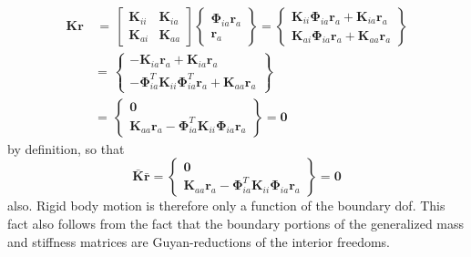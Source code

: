 \documentclass[10pt,openany,twoside]{book}
\numberwithin{equation}{section}   %
\newcommand{\Matrix}[1]{\boldsymbol{#1}}
\newcommand{\Vector}[1]{\boldsymbol{#1}}
\begin{document}
\begin{equation}
\begin{split}
\Matrix{K}\Vector{r} & \, = \, \left[
\begin{array}{cc}
   \Matrix{K}_{ii} & \Matrix{K}_{ia} \\
   \Matrix{K}_{ai} & \Matrix{K}_{aa}
\end{array}
\right] \left\{
\begin{array}{c}
   \Matrix{\Phi}_{ia} \Matrix{r}_a \\
   \Matrix{r}_a
\end{array}
\right\} =  \left\{
\begin{array}{c}
   \Matrix{K}_{ii} \Matrix{\Phi}_{ia} \Matrix{r}_a + \Matrix{K}_{ia} \Matrix{r}_a \\
   \Matrix{K}_{ai} \Matrix{\Phi}_{ia} \Matrix{r}_a + \Matrix{K}_{aa} \Matrix{r}_a
\end{array}
\right\}                                        \\
 & = \, \left\{
\begin{array}{c}
   - \Matrix{K}_{ia} \Vector{r}_a + \Matrix{K}_{ia} \Vector{r}_a \\
   - \Matrix{\Phi}_{ia}^T \Matrix{K}_{ii} \Matrix{\Phi}_{ia}^T \Vector{r}_a +
                \Matrix{K}_{aa} \Vector{r}_a
\end{array}
\right\} \\
 & = \, \left\{
\begin{array}{c}
   \Matrix{0} \\
   \Matrix{K}_{aa} \Vector{r}_a -
                        \Matrix{\Phi}_{ia}^T \Matrix{K}_{ii} \Matrix{\Phi}_{ia} \Vector{r}_a
\end{array}
\right\} = \Vector{0}
\end{split}		\nonumber
\end{equation}
by definition, so that
\begin{equation}
\Matrix{\bar{K}} \Matrix{\bar{r}} = \left\{
\begin{array}{c}
   \Vector{0} \\
   \Matrix{K}_{aa} \Vector{r}_a - \Matrix{\Phi}_{ia}^T \Matrix{K}_{ii} \Matrix{\Phi}_{ia} \Vector{r}_a
\end{array}
\right\} = \Vector{0}		\nonumber
\end{equation}
also. Rigid body motion is therefore only a function of the
boundary dof. This fact also follows from the fact
that the boundary portions of the generalized mass and
stiffness matrices are Guyan-reductions of the
interior freedoms.
\end{document}
